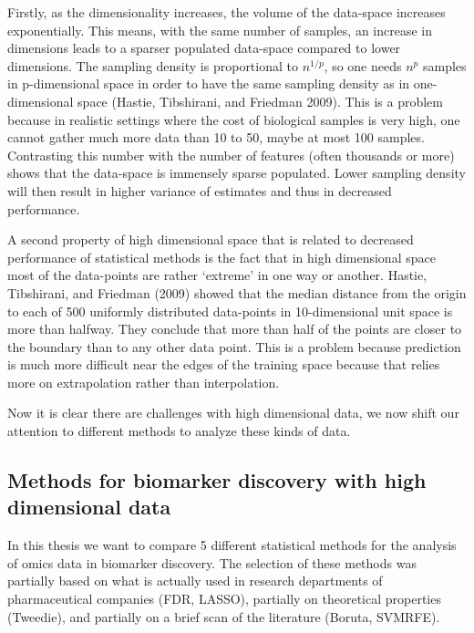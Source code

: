 \documentclass[
]{article}
\begin{document}
Firstly, as the dimensionality increases, the volume of the data-space increases exponentially. This means, with the same number of samples, an increase in dimensions leads to a sparser populated data-space compared to lower dimensions. The sampling density is proportional to \(n^{1/p}\), so one needs \(n^p\) samples in p-dimensional space in order to have the same sampling density as in one-dimensional space (Hastie, Tibshirani, and Friedman 2009). This is a problem because in realistic settings where the cost of biological samples is very high, one cannot gather much more data than 10 to 50, maybe at most 100 samples. Contrasting this number with the number of features (often thousands or more) shows that the data-space is immensely sparse populated. Lower sampling density will then result in higher variance of estimates and thus in decreased performance.

A second property of high dimensional space that is related to decreased performance of statistical methods is the fact that in high dimensional space most of the data-points are rather `extreme' in one way or another. Hastie, Tibshirani, and Friedman (2009) showed that the median distance from the origin to each of 500 uniformly distributed data-points in 10-dimensional unit space is more than halfway. They conclude that more than half of the points are closer to the boundary than to any other data point. This is a problem because prediction is much more difficult near the edges of the training space because that relies more on extrapolation rather than interpolation.

Now it is clear there are challenges with high dimensional data, we now shift our attention to different methods to analyze these kinds of data.

\hypertarget{methods-for-biomarker-discovery-with-high-dimensional-data}{%
\subsection{Methods for biomarker discovery with high dimensional data}\label{methods-for-biomarker-discovery-with-high-dimensional-data}}

In this thesis we want to compare 5 different statistical methods for the analysis of omics data in biomarker discovery. The selection of these methods was partially based on what is actually used in research departments of pharmaceutical companies (FDR, LASSO), partially on theoretical properties (Tweedie), and partially on a brief scan of the literature (Boruta, SVMRFE).
\end{document}
